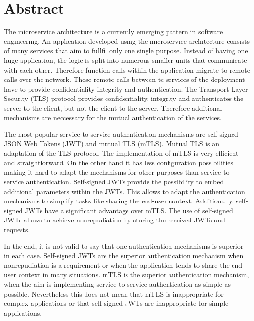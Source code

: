 \chapter{Abstract}
The microservice architecture is a currently emerging pattern in software engineering.
An application developed using the microservice architecture consists of many services that aim to fullfil only one single purpose.
Instead of having one huge application, the logic is split into numerous smaller units that communicate with each other.
Therefore function calls within the application migrate to remote calls over the network.
Those remote calls between te services of the deployment have to provide confidentiality integrity and authentication.
The Transport Layer Security (TLS) protocol provides confidentiality, integrity and authenticates the server to the client, but not the client to the server.
Therefore additional mechanisms are neccessary for the mutual authentication of the services.

The most popular service-to-service authentication mechanisms are self-signed JSON Web Tokens (JWT) and mutual TLS (mTLS).
Mutual TLS is an adaptation of the TLS protocol.
The implementation of mTLS is very efficient and straightforward.
On the other hand it has less configuration possibilities making it hard to adapt the mechanisms for other purposes than service-to-service authentication.
Self-signed JWTs provide the possibility to embed additional parameters within the JWTs.
This allows to adapt the authentication mechanisms to simplify tasks like sharing the end-user context.
Additionally, self-signed JWTs have a significant advantage over mTLS.
The use of self-signed JWTs allows to achieve nonrepudiation by storing the received JWTs and requests.

In the end, it is not valid to say that one authentication mechanisms is superior in each case.
Self-signed JWTs are the superior authentication mechanism when nonrepudiation is a requirement or when the application tends to share the end-user context in many situations.
mTLS is the superior authentication mechanism, when the aim is implementing service-to-service authentication as simple as possible.
Nevertheless this does not mean that mTLS is inappropriate for complex applications or that self-signed JWTs are inappropriate for simple applications.
